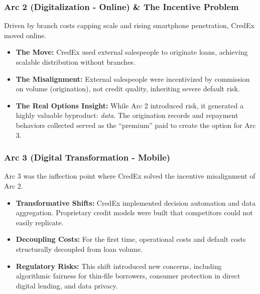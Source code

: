 \subsubsection{Arc 2 (Digitalization - Online) \& The Incentive Problem}
Driven by branch costs capping scale and rising smartphone penetration, CredEx
moved online.
\begin{itemize}
    \item \textbf{The Move:} CredEx used external salespeople to originate loans, achieving
          scalable distribution without branches.
    \item \textbf{The Misalignment:} External salespeople were incentivized by commission on
          volume (origination), not credit quality, inheriting severe default risk.
    \item \textbf{The Real Options Insight:} While Arc 2 introduced risk, it generated a highly
          valuable byproduct: \textit{data}. The origination records and repayment behaviors collected served as the
          ``premium'' paid to create the option for Arc 3.
\end{itemize}

\subsubsection{Arc 3 (Digital Transformation - Mobile)}
Arc 3 was the inflection point where CredEx solved the incentive misalignment
of Arc 2.
\begin{itemize}
    \item \textbf{Transformative Shifts:} CredEx implemented decision automation and data
          aggregation. Proprietary credit models were built that competitors could not
          easily replicate.
    \item \textbf{Decoupling Costs:} For the first time, operational costs and default costs
          structurally decoupled from loan volume.
    \item \textbf{Regulatory Risks:} This shift introduced new concerns, including algorithmic
          fairness for thin-file borrowers, consumer protection in direct digital
          lending, and data privacy.
\end{itemize}

